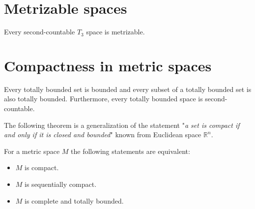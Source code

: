 \section{Metrizable spaces}    
	
	\begin{theorem}
		Every second-countable $T_3$ space is metrizable.
	\end{theorem}

\section{Compactness in metric spaces}

	\begin{property}
		Every totally bounded set is bounded and every subset of a totally bounded set is also totally bounded. Furthermore, every totally bounded space is second-countable.
	\end{property}
	
	The following theorem is a generalization of the statement "\textit{a set is compact if and only if it is closed and bounded}" known from Euclidean space $\mathbb{R}^n$.
	\begin{theorem}
		For a metric space $M$ the following statements are equivalent:
		\begin{itemize}
			\item $M$ is compact.
			\item $M$ is sequentially compact.
			\item $M$ is complete and totally bounded.
		\end{itemize}
	\end{theorem}	
	
